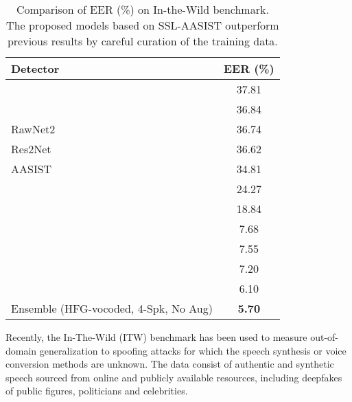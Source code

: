 \begin{table}[htb!]
    \caption{Comparison of EER (\%) on In-the-Wild benchmark. The proposed models based on SSL-AASIST outperform previous results by careful curation of the training data.}
    \label{tab:in_the_wild}
    \vskip 0.15in
\begin{center}
\begin{small}
\begin{sc}
    \begin{tabular}{lc}
    \toprule
Detector & EER (\%) \\ 
    \midrule
    \cite{müller2024doesaudiodeepfakedetection}  & 37.81\\
    \cite{wang2023detectioncrossdatasetfakeaudio} & 36.84 \\ 
RawNet2~\cite{yi2023audiodeepfakedetectionsurvey} & 36.74 \\ 
   Res2Net~\cite{yi2023audiodeepfakedetectionsurvey} & 36.62 \\ 
     AASIST~\cite{yi2023audiodeepfakedetectionsurvey} &34.81 \\ 
   \cite{yang2024robustaudiodeepfakedetection} & 24.27 \\ 
    \cite{kulkarni24_asvspoof} & 18.84 \\ 
    \cite{lu2023oneclassknowledgedistillationspoofing} & 7.68 \\ 
    \cite{wang2023spoofedtrainingdataspeech} & 7.55 \\ 
    
\cite{pascu2024generalisablecalibratedsyntheticspeech} & 7.20 \\ 

\cite{wang2023largescalevocodedspoofeddata}  & 6.10\\ 
\midrule
  Ensemble (HFG-vocoded, 4-Spk, No Aug) & \textbf{5.70}\\
     \bottomrule 
    \end{tabular}
    \end{sc}
\end{small}
\end{center}
\vskip -0.1in
\end{table}

Recently, the In-The-Wild \cite{müller2024doesaudiodeepfakedetection} (ITW) benchmark has been used to measure out-of-domain generalization to spoofing attacks for which the speech synthesis or voice conversion methods are unknown. The data consist of authentic and synthetic speech sourced from online and publicly available resources, including deepfakes of public figures, politicians and celebrities.

